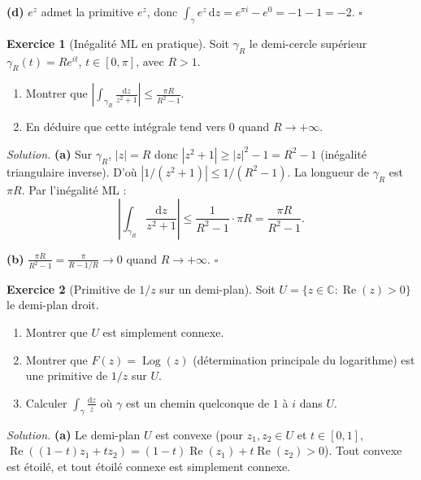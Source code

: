 \documentclass[12pt,a4paper,openany]{book}
\theoremstyle{definition}
\newtheorem{exercice}{Exercice}[chapter]
\theoremstyle{plain}
\theoremstyle{remark}
\newcommand{\C}{\mathbb{C}}
\DeclareMathOperator{\re}{Re}
\DeclareMathOperator{\Log}{Log}
\newcommand{\dd}{\mathrm{d}}
\newcommand{\abs}[1]{\left|#1\right|}
\begin{document}
\textbf{(d)} $e^z$ admet la primitive $e^z$, donc
$\int_\gamma e^z\,\dd z = e^{\pi i} - e^0 = -1 - 1 = -2$. \hfill$\square$

\bigskip

\begin{exercice}[Inégalité ML en pratique]\label{exo:ML-pratique}
Soit $\gamma_R$ le demi-cercle supérieur $\gamma_R(t) = Re^{it}$,
$t \in [0, \pi]$, avec $R > 1$.
\begin{enumerate}[label=\textup{(\alph*)}]
  \item Montrer que $\displaystyle\abs{\int_{\gamma_R}
    \frac{\dd z}{z^2+1}} \leq \frac{\pi R}{R^2 - 1}$.
  \item En déduire que cette intégrale tend vers $0$ quand $R \to +\infty$.
\end{enumerate}
\end{exercice}

\noindent\textit{Solution.}\enspace
\textbf{(a)} Sur $\gamma_R$, $\abs{z} = R$ donc $\abs{z^2+1} \geq
\abs{z}^2 - 1 = R^2 - 1$ (inégalité triangulaire inverse). D'où
$\abs{1/(z^2+1)} \leq 1/(R^2-1)$. La longueur de $\gamma_R$ est
$\pi R$. Par l'inégalité ML :
\[
  \abs{\int_{\gamma_R} \frac{\dd z}{z^2+1}} \leq \frac{1}{R^2-1} \cdot \pi R
  = \frac{\pi R}{R^2-1}.
\]

\textbf{(b)} $\frac{\pi R}{R^2-1} = \frac{\pi}{R - 1/R} \to 0$ quand
$R \to +\infty$. \hfill$\square$

\bigskip

\begin{exercice}[Primitive de $1/z$ sur un demi-plan]\label{exo:primitive-1z}
Soit $U = \{z \in \C : \re(z) > 0\}$ le demi-plan droit.
\begin{enumerate}[label=\textup{(\alph*)}]
  \item Montrer que $U$ est simplement connexe.
  \item Montrer que $F(z) = \Log(z)$ (détermination principale du logarithme)
    est une primitive de $1/z$ sur $U$.
  \item Calculer $\displaystyle\int_\gamma \frac{\dd z}{z}$ où $\gamma$ est
    un chemin quelconque de $1$ à $i$ dans $U$.
\end{enumerate}
\end{exercice}

\noindent\textit{Solution.}\enspace
\textbf{(a)} Le demi-plan $U$ est convexe (pour $z_1, z_2 \in U$ et
$t \in [0,1]$, $\re((1-t)z_1+tz_2) = (1-t)\re(z_1)+t\re(z_2) > 0$). Tout
convexe est étoilé, et tout étoilé connexe est simplement connexe.
\end{document}
